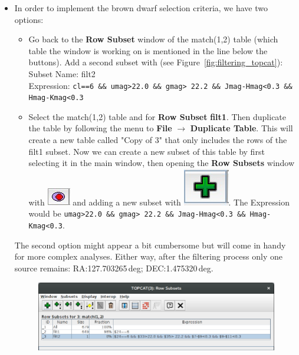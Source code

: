 \documentclass [a4paper, 12pt]{article}
\begin{document}
\begin{itemize}
    \item In order to implement the brown dwarf selection criteria, we have two 
    options:
    \begin{itemize}
        \item Go back to the \textbf{Row Subset} window of the match(1,2) table 
        (which table the window is working on is mentioned in the line below 
        the buttons). Add a second subset 
        with (see Figure~\ref{fig:filtering_topcat}):\\
        Subset Name: filt2\\
        Expression: \texttt{cl==6 \&\& umag>22.0 \&\& gmag> 22.2 \&\& 
        Jmag-Hmag<0.3 \&\& Hmag-Kmag<0.3}\\
        \item Select the match(1,2) table and for \textbf{Row Subset}  
        \textbf{filt1}. Then duplicate the table by following the menu to 
        \textbf{File} $\rightarrow$ \textbf{Duplicate Table}. This will create 
        a new table called "Copy of 3" that only includes the rows of the filt1 
        subset. Now we can create a new subset of this table by first selecting 
        it in the main window, then opening the \textbf{Row Subsets} window 
        with \includegraphics[width=0.04        
        \textwidth]{../images/topcat_button_subset.jpg} and adding a new subset 
        with 
        \includegraphics[width=0.04 
        \textwidth]{../images/topcat_button_add.jpg}. The Expression would be 
        \texttt{umag>22.0 \&\& gmag> 22.2 \&\& Jmag-Hmag<0.3 \&\& 
        Hmag-Kmag<0.3}. 
    \end{itemize} 
    The second option might appear a bit cumbersome but will come in handy for 
    more complex analyses. Either way, after the filtering process only one 
    source remains: RA:127.703265\,deg; DEC:1.475320\,deg. 
    \begin{figure}[H]
        \center
        \includegraphics[width=0.8 
        \textwidth]{../images/topcat_filter_2MASS_SDSS.png}

\end{figure}
\end{itemize}
\end{document}
